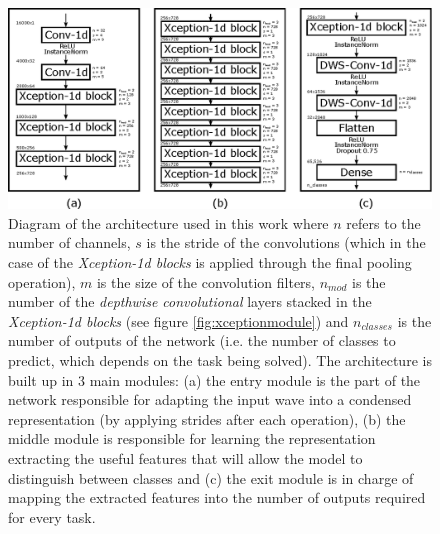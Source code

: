 \documentclass[review]{elsarticle}
\begin{document}
\begin{figure}[h]
	\centering
	\includegraphics[width=1.0\linewidth]{img/arch.eps}
	\caption{Diagram of the architecture used in this work where $n$ refers to the number of channels, $s$ is the stride of the convolutions (which in the case of the \textit{Xception-1d blocks} is applied through the final pooling operation), $m$ is the size of the convolution filters, $n_{mod}$ is the number of the \textit{depthwise convolutional} layers stacked in the \textit{Xception-1d blocks} (see figure \ref{fig:xceptionmodule}) and $n_{classes}$ is the number of outputs of the network (i.e. the number of classes to predict, which depends on the task being solved). The architecture is built up in 3 main modules: (a) the entry module is the part of the network responsible for adapting the input wave into a condensed representation (by applying strides after each operation), (b) the middle module is responsible for learning the representation extracting the useful features that will allow the model to distinguish between classes and (c) the exit module is in charge of mapping the extracted features into the number of outputs required for every task.}
	\label{fig:arch}
\end{figure}
\end{document}
